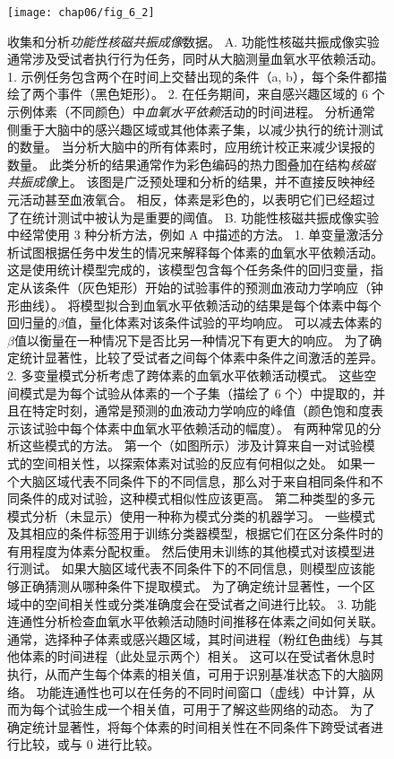 \begin{figure}[htbp]
	\centering
	\texttt{[image: chap06/fig\_6\_2]}
	\caption{收集和分析\textit{功能性核磁共振成像}数据。
		A. 功能性核磁共振成像实验通常涉及受试者执行行为任务，同时从大脑测量血氧水平依赖活动。
		1. 示例任务包含两个在时间上交替出现的条件（a, b），每个条件都描绘了两个事件（黑色矩形）。
		2. 在任务期间，来自感兴趣区域的 6 个示例体素（不同颜色）中\textit{血氧水平依赖}活动的时间进程。
		分析通常侧重于大脑中的感兴趣区域或其他体素子集，以减少执行的统计测试的数量。
		当分析大脑中的所有体素时，应用统计校正来减少误报的数量。
		此类分析的结果通常作为彩色编码的热力图叠加在结构\textit{核磁共振成像}上。
		该图是广泛预处理和分析的结果，并不直接反映神经元活动甚至血液氧合。
		相反，体素是彩色的，以表明它们已经超过了在统计测试中被认为是重要的阈值。
		B. 功能性核磁共振成像实验中经常使用 3 种分析方法，例如 A 中描述的方法。
		1. 单变量激活分析试图根据任务中发生的情况来解释每个体素的血氧水平依赖活动。 
		这是使用统计模型完成的，该模型包含每个任务条件的回归变量，指定从该条件（灰色矩形）开始的试验事件的预测血液动力学响应（钟形曲线）。 
		将模型拟合到血氧水平依赖活动的结果是每个体素中每个回归量的$\beta$值，量化体素对该条件试验的平均响应。 
		可以减去体素的$\beta$值以衡量在一种情况下是否比另一种情况下有更大的响应。
		为了确定统计显著性，比较了受试者之间每个体素中条件之间激活的差异。
		2. 多变量模式分析考虑了跨体素的血氧水平依赖活动模式。
		这些空间模式是为每个试验从体素的一个子集（描绘了 6 个）中提取的，并且在特定时刻，通常是预测的血液动力学响应的峰值（颜色饱和度表示该试验中每个体素中血氧水平依赖活动的幅度）。
		有两种常见的分析这些模式的方法。
		第一个（如图所示）涉及计算来自一对试验模式的空间相关性，以探索体素对试验的反应有何相似之处。
		如果一个大脑区域代表不同条件下的不同信息，那么对于来自相同条件和不同条件的成对试验，这种模式相似性应该更高。
		第二种类型的多元模式分析（未显示）使用一种称为模式分类的机器学习。
		一些模式及其相应的条件标签用于训练分类器模型，根据它们在区分条件时的有用程度为体素分配权重。
		然后使用未训练的其他模式对该模型进行测试。
		如果大脑区域代表不同条件下的不同信息，则模型应该能够正确猜测从哪种条件下提取模式。
		为了确定统计显著性，一个区域中的空间相关性或分类准确度会在受试者之间进行比较。
		3. 功能连通性分析检查血氧水平依赖活动随时间推移在体素之间如何关联。
		通常，选择种子体素或感兴趣区域，其时间进程（粉红色曲线）与其他体素的时间进程（此处显示两个）相关。
		这可以在受试者休息时执行，从而产生每个体素的相关值，可用于识别基准状态下的大脑网络。
		功能连通性也可以在任务的不同时间窗口（虚线）中计算，从而为每个试验生成一个相关值，可用于了解这些网络的动态。
		为了确定统计显著性，将每个体素的时间相关性在不同条件下跨受试者进行比较，或与 0 进行比较。}
	\label{fig:6_2}
\end{figure}

